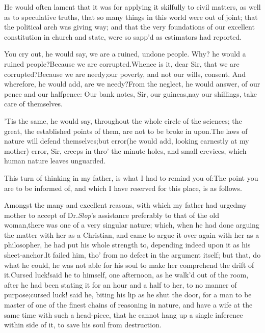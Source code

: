 \documentclass{article}
\begin{document}
He would often lament that it was for
applying it skilfully to civil matters, as well
as to speculative truths, that so many things in this world were
out of joint;\tsk\break
that the political arch was giving way;\tsk{}
and that the very foundations of our excellent constitution in
church and state, were so sapp’d as estimators had reported.

You cry out, he would say, we are a ruined, undone people.\tsk
Why? he would 
a ruined people?\tsk Because we are
corrup\-ted.\tsk Whence is it, dear Sir, that we are
corrupted?\tsk Because we are needy;\tsk our
poverty, and not our wills, consent.\tsk\break
And wherefore, he would add, are we needy?\tsk From the neglect, he would answer,
of our pence and our halfpence:\tsk\break
Our bank notes, Sir, our guineas,\tsk nay our shillings,
take care of themselves.

’Tis the same, he would say, throughout the whole circle
of the sciences;\tsk{}
the great, the established points of them, are not to be broke
in upon.\tsk The laws of nature will defend themselves;\tsk but
error\tsk (he would add, looking earnestly at my mother)\tsk
error, Sir, creeps in thro’ the minute holes, and small
crevices, which human nature leaves unguarded.

This turn of thinking in my father, is what I had to remind you
of:\tsk The point you are to be informed of, and which I have
reserved for this place, is as follows.

Amongst the many and excellent reasons, with which my father had
urged\break my mother to accept of Dr.\@ \textit{Slop}’s as\-sistance
preferably to that of the old wo\-man,\tsk there was one of a very
singular nature; which, when he had done arguing the matter with
her as a Christian,\break
and came to argue it over again with her
as a philosopher, he had put his whole strength to, depending
indeed upon it as his sheet-anchor.\tsh It failed him, tho’ from
no defect in the argument itself; but that, do what he could, he
was not able for his soul to make her comprehend the drift of
it.\tsh Cursed luck!\tsh said he to himself, one afternoon, as
he walk’d out of the room, after he had been stating it for an
hour and a half to her, to no manner of purpose;\tsk cursed
luck! said he, biting his lip as he shut the door,\break
\tsk for a man
to be master of one of the finest chains of reasoning in
nature,\tsh\break
and have a wife at the same time with such a
head-piece, that he cannot hang up a single inference within
side of it, to save his soul from destruction.
\end{document}
